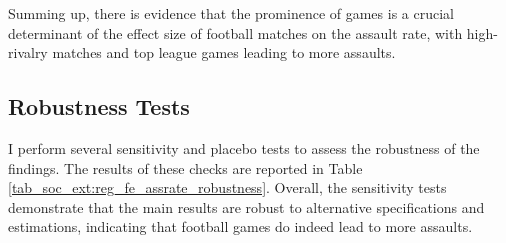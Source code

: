 Summing up, there is evidence that the prominence of games is a crucial determinant of the effect size of football matches on the assault rate, with high-rivalry matches and top league games leading to more assaults.













\subsection{Robustness Tests}
I perform several sensitivity and placebo tests to assess the robustness of the findings. The results of these checks are reported in Table \ref{tab_soc_ext:reg_fe_assrate_robustness}. Overall, the sensitivity tests demonstrate that the main results are robust to alternative specifications and estimations, indicating that football games do indeed lead to more assaults.\newline




